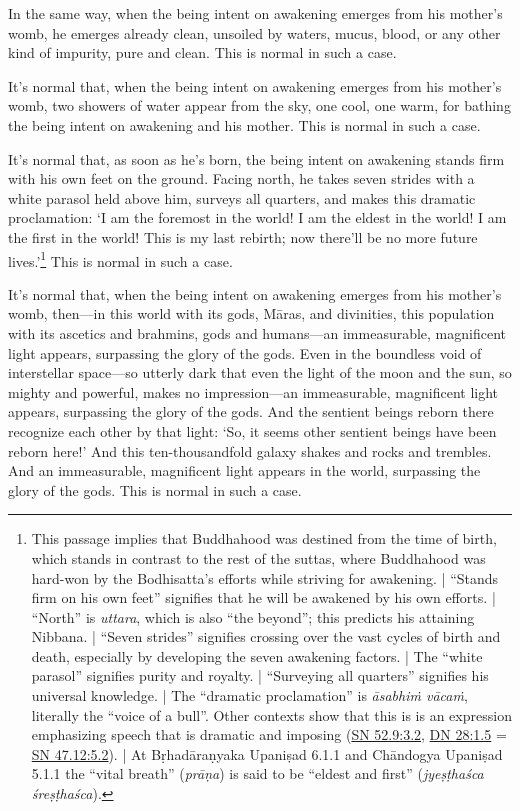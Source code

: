 \documentclass[12pt,openany]{book}%
\begin{document}
In the same way, when the being intent on awakening emerges from his mother’s womb, he emerges already clean, unsoiled by waters, mucus, blood, or any other kind of impurity, pure and clean. This is normal in such a case. 

It’s normal that, when the being intent on awakening emerges from his mother’s womb, two showers of water appear from the sky, one cool, one warm, for bathing the being intent on awakening and his mother. This is normal in such a case. 

It’s normal that, as soon as he’s born, the being intent on awakening stands firm with his own feet on the ground. Facing north, he takes seven strides with a white parasol held above him, surveys all quarters, and makes this dramatic proclamation: ‘I am the foremost in the world! I am the eldest in the world! I am the first in the world! This is my last rebirth; now there’ll be no more future lives.’\footnote{This passage implies that Buddhahood was destined from the time of birth, which stands in contrast to the rest of the suttas, where Buddhahood was hard-won by the Bodhisatta’s efforts while striving for awakening. | “Stands firm on his own feet” signifies that he will be awakened by his own efforts. | “North” is \textit{uttara}, which is also “the beyond”; this predicts his attaining Nibbana. | “Seven strides” signifies crossing over the vast cycles of birth and death, especially by developing the seven awakening factors. | The “white parasol” signifies purity and royalty. | “Surveying all quarters” signifies his universal knowledge. | The “dramatic proclamation” is \textit{\textsanskrit{āsabhiṁ} \textsanskrit{vācaṁ}}, literally the “voice of a bull”. Other contexts show that this is is an expression emphasizing speech that is dramatic and imposing (\href{https://suttacentral.net/sn52.9/en/sujato\#3.2}{SN 52.9:3.2}, \href{https://suttacentral.net/dn28/en/sujato\#1.5}{DN 28:1.5} = \href{https://suttacentral.net/sn47.12/en/sujato\#5.2}{SN 47.12:5.2}). | At \textsanskrit{Bṛhadāraṇyaka} \textsanskrit{Upaniṣad} 6.1.1 and \textsanskrit{Chāndogya} \textsanskrit{Upaniṣad} 5.1.1 the “vital breath” (\textit{\textsanskrit{prāṇa}}) is said to be “eldest and first” (\textit{\textsanskrit{jyeṣṭhaśca} \textsanskrit{śreṣṭhaśca}}). } This is normal in such a case. 

It’s normal that, when the being intent on awakening emerges from his mother’s womb, then—in this world with its gods, \textsanskrit{Māras}, and divinities, this population with its ascetics and brahmins, gods and humans—an immeasurable, magnificent light appears, surpassing the glory of the gods. Even in the boundless void of interstellar space—so utterly dark that even the light of the moon and the sun, so mighty and powerful, makes no impression—an immeasurable, magnificent light appears, surpassing the glory of the gods. And the sentient beings reborn there recognize each other by that light: ‘So, it seems other sentient beings have been reborn here!’ And this ten-thousandfold galaxy shakes and rocks and trembles. And an immeasurable, magnificent light appears in the world, surpassing the glory of the gods. This is normal in such a case. 
\end{document}
